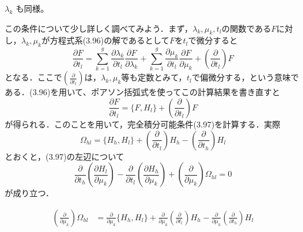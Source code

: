 \vspace{1em}
\noindent
$\lambda_k$ も同様。

\begin{story}

この条件について少し詳しく調べてみよう．まず，$\lambda_k, \mu_k, t_l$の関数である$F$に対し，$\lambda_k, \mu_k$が方程式系(3.96)の解であるとして$F$を$t_l$で微分すると
\begin{equation*}
    \frac{\partial F}{\partial t_l} = \sum_{k=1}^g \frac{\partial \lambda_k}{\partial t_l} \frac{\partial F}{\partial \lambda_k} + \sum_{k=1}^g \frac{\partial \mu_k}{\partial t_l} \frac{\partial F}{\partial \mu_k} + \left( \frac{\partial}{\partial t_l} \right) F
\end{equation*}
となる．ここで$\left( \frac{\partial}{\partial t_l} \right)$は，$\lambda_k, \mu_k$等も定数とみて，$t_l$で偏微分する，という意味である．(3.96)を用いて、ポアソン括弧式を使ってこの計算結果を書き直すと
\begin{equation}
    \frac{\partial F}{\partial t_l} = \{F, H_l\} + \left( \frac{\partial}{\partial t_l} \right) F \tag{3.99}
\end{equation}
が得られる．このことを用いて，完全積分可能条件(3.97)を計算する．実際
\begin{equation}
    \Omega_{hl} = \{H_h, H_l\} + \left( \frac{\partial}{\partial t_l} \right) H_h - \left( \frac{\partial}{\partial t_h} \right) H_l \tag{3.100}
\end{equation}
とおくと，(3.97)の左辺について
\begin{equation*}
    \frac{\partial}{\partial t_h} \left( \frac{\partial H_l}{\partial \mu_k} \right) - \frac{\partial}{\partial t_l} \left( \frac{\partial H_h}{\partial \mu_k} \right) + \left( \frac{\partial}{\partial \mu_k} \right) \Omega_{hl} = 0
\end{equation*}
が成り立つ．
\end{story}
\begin{align*}
    \left( \frac{\partial}{\partial \mu_k} \right) \Omega_{hl} &= \frac{\partial}{\partial \mu_k} \{H_h, H_l\} + \frac{\partial}{\partial \mu_k} \left( \frac{\partial}{\partial t_l} \right) H_h - \frac{\partial}{\partial \mu_k} \left( \frac{\partial}{\partial t_h} \right) H_l
\end{align*}

